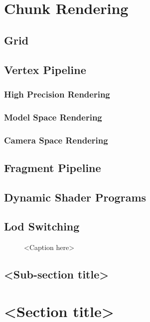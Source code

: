 \section{Chunk Rendering}

\subsection{Grid}

\subsection{Vertex Pipeline}

\subsubsection{High Precision Rendering}

\subsubsection{Model Space Rendering}

\subsubsection{Camera Space Rendering}

\subsection{Fragment Pipeline}

\subsection{Dynamic Shader Programs}

\subsection{Lod Switching}



\begin{figure}[htb]
\centering
\caption{<Caption here>}
\end{figure}

\subsection{<Sub-section title>}

\section{<Section title>}


